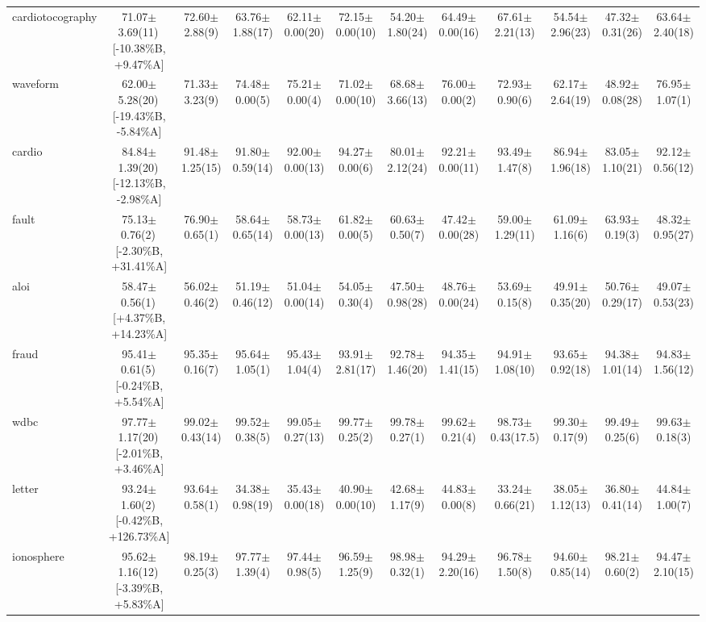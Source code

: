 \documentclass[conference]{IEEEtran}
\begin{document}
\begin{table}
{\begin{tabular}{lccccccccccc}
				cardiotocography & 71.07$\pm$3.69(11)\,[{-}10.38\%B, {+}9.47\%A] & 72.60$\pm$2.88(9) & 63.76$\pm$1.88(17) & 62.11$\pm$0.00(20) & 72.15$\pm$0.00(10) & 54.20$\pm$1.80(24) & 64.49$\pm$0.00(16) & 67.61$\pm$2.21(13) & 54.54$\pm$2.96(23) & 47.32$\pm$0.31(26) & 63.64$\pm$2.40(18) \\
				waveform & 62.00$\pm$5.28(20)\,[{-}19.43\%B, {-}5.84\%A] & 71.33$\pm$3.23(9) & 74.48$\pm$0.00(5) & 75.21$\pm$0.00(4) & 71.02$\pm$0.00(10) & 68.68$\pm$3.66(13) & 76.00$\pm$0.00(2) & 72.93$\pm$0.90(6) & 62.17$\pm$2.64(19) & 48.92$\pm$0.08(28) & 76.95$\pm$1.07(1) \\
				cardio & 84.84$\pm$1.39(20)\,[{-}12.13\%B, {-}2.98\%A] & 91.48$\pm$1.25(15) & 91.80$\pm$0.59(14) & 92.00$\pm$0.00(13) & 94.27$\pm$0.00(6) & 80.01$\pm$2.12(24) & 92.21$\pm$0.00(11) & 93.49$\pm$1.47(8) & 86.94$\pm$1.96(18) & 83.05$\pm$1.10(21) & 92.12$\pm$0.56(12) \\
				fault & 75.13$\pm$0.76(2)\,[{-}2.30\%B, {+}31.41\%A] & 76.90$\pm$0.65(1) & 58.64$\pm$0.65(14) & 58.73$\pm$0.00(13) & 61.82$\pm$0.00(5) & 60.63$\pm$0.50(7) & 47.42$\pm$0.00(28) & 59.00$\pm$1.29(11) & 61.09$\pm$1.16(6) & 63.93$\pm$0.19(3) & 48.32$\pm$0.95(27) \\
				aloi & 58.47$\pm$0.56(1)\,[{+}4.37\%B, {+}14.23\%A] & 56.02$\pm$0.46(2) & 51.19$\pm$0.46(12) & 51.04$\pm$0.00(14) & 54.05$\pm$0.30(4) & 47.50$\pm$0.98(28) & 48.76$\pm$0.00(24) & 53.69$\pm$0.15(8) & 49.91$\pm$0.35(20) & 50.76$\pm$0.29(17) & 49.07$\pm$0.53(23) \\
				fraud & 95.41$\pm$0.61(5)\,[{-}0.24\%B, {+}5.54\%A] & 95.35$\pm$0.16(7) & 95.64$\pm$1.05(1) & 95.43$\pm$1.04(4) & 93.91$\pm$2.81(17) & 92.78$\pm$1.46(20) & 94.35$\pm$1.41(15) & 94.91$\pm$1.08(10) & 93.65$\pm$0.92(18) & 94.38$\pm$1.01(14) & 94.83$\pm$1.56(12) \\
				wdbc & 97.77$\pm$1.17(20)\,[{-}2.01\%B, {+}3.46\%A] & 99.02$\pm$0.43(14) & 99.52$\pm$0.38(5) & 99.05$\pm$0.27(13) & 99.77$\pm$0.25(2) & 99.78$\pm$0.27(1) & 99.62$\pm$0.21(4) & 98.73$\pm$0.43(17.5) & 99.30$\pm$0.17(9) & 99.49$\pm$0.25(6) & 99.63$\pm$0.18(3) \\
				letter & 93.24$\pm$1.60(2)\,[{-}0.42\%B, {+}126.73\%A] & 93.64$\pm$0.58(1) & 34.38$\pm$0.98(19) & 35.43$\pm$0.00(18) & 40.90$\pm$0.00(10) & 42.68$\pm$1.17(9) & 44.83$\pm$0.00(8) & 33.24$\pm$0.66(21) & 38.05$\pm$1.12(13) & 36.80$\pm$0.41(14) & 44.84$\pm$1.00(7) \\
				ionosphere & 95.62$\pm$1.16(12)\,[{-}3.39\%B, {+}5.83\%A] & 98.19$\pm$0.25(3) & 97.77$\pm$1.39(4) & 97.44$\pm$0.98(5) & 96.59$\pm$1.25(9) & 98.98$\pm$0.32(1) & 94.29$\pm$2.20(16) & 96.78$\pm$1.50(8) & 94.60$\pm$0.85(14) & 98.21$\pm$0.60(2) & 94.47$\pm$2.10(15) \\

\end{tabular}}
\end{table}
\end{document}
